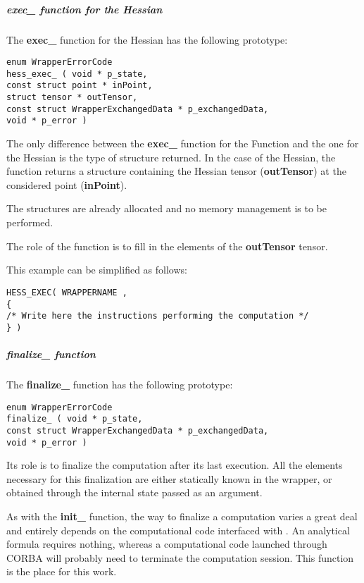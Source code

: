 \subparagraph{exec\_ function for the Hessian}

The {\bf exec\_} function for the Hessian has the following prototype:

\lstset{language=C++, basicstyle=\normalsize}
\begin{lstlisting}[frame=TBRL]
enum WrapperErrorCode
hess_exec_ ( void * p_state,
const struct point * inPoint,
struct tensor * outTensor,
const struct WrapperExchangedData * p_exchangedData,
void * p_error )
\end{lstlisting}

The only difference between the {\bf exec\_} function for the Function and the one for the Hessian is the type of structure returned. In the case of the Hessian, the function returns a  structure containing the Hessian tensor ({\bf outTensor}) at the considered point ({\bf inPoint}).

The structures are already allocated and no memory management is to be performed.

The role of the function is to fill in the elements of the {\bf outTensor} tensor.

This example can be simplified as follows:
\lstset{language=C++, basicstyle=\normalsize}
\begin{lstlisting}[frame=TBRL]
HESS_EXEC( WRAPPERNAME ,
{
/* Write here the instructions performing the computation */
} )
\end{lstlisting}

\subparagraph{finalize\_ function}

The {\bf finalize\_} function has the following prototype:

\lstset{language=C++, basicstyle=\normalsize}
\begin{lstlisting}[frame=TBRL]
enum WrapperErrorCode
finalize_ ( void * p_state,
const struct WrapperExchangedData * p_exchangedData,
void * p_error )
\end{lstlisting}

Its role is to finalize the computation after its last execution. All the elements necessary for this finalization are either statically known in the wrapper, or obtained through the internal state passed as an argument.

As with the {\bf init\_} function, the way to finalize a computation varies a great deal and entirely depends on the computational code interfaced with \OT . An analytical formula requires nothing, whereas a computational code launched through CORBA will probably need to terminate the computation session. This function is the place for this work.

